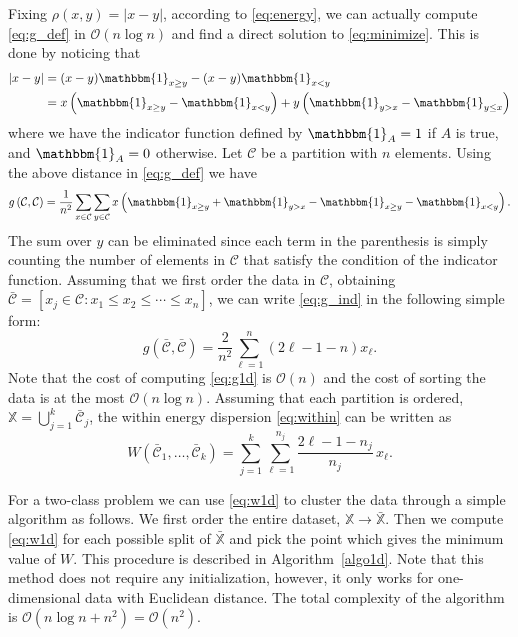 \documentclass[aps,preprint,nofootinbib,floatfix]{revtex4-1}
\newcommand\C{{\mathcal{C}}}
\newcommand\OO{{\mathcal{O}}}
\newcommand{\Ind}[1]{\mathbbm{1}_{#1}}
\begin{document}
Fixing
$\rho(x,y) = |x - y|$, according to \eqref{eq:energy}, we can actually compute 
\eqref{eq:g_def} in $\OO(n \log n)$ and find
a direct solution to \eqref{eq:minimize}. 
This is done by noticing that
\begin{equation}
\begin{aligned}
|x - y|  &= (x-y)\Ind{x \ge y} -
(x-y) \Ind{x < y}  \\
&= 
x \left( \Ind{x \ge y} - \Ind{x < y} \right)  + 
y \left( \Ind{y > x} - \Ind{y \le x} \right)  
\end{aligned}
\end{equation}
where we have the indicator function defined by 
$\Ind{A}=1$ if $A$ is true, and $\Ind{A}=0$ otherwise. 
Let $\C$ be a partition with
$n$ elements. Using the above distance in \eqref{eq:g_def} we have
\begin{equation}
\label{eq:g_ind}
g\left(\C,\C\right) = \dfrac{1}{n^2} \sum_{x \in \C} 
\sum_{y \in \C} 
x \left(
\Ind{x \ge y} + \Ind{y > x} - 
\Ind{x \ge y}-\Ind{x < y} \right) .
\end{equation}
The sum over $y$ can be eliminated since each term in
the parenthesis is simply counting the number of elements in $\C$ that satisfy
the condition of the indicator function. Assuming
that we first order the data in $\C$, obtaining
$\bar{\C} = [ x_j \in \C: x_1 \le x_2 \le \dotsm \le x_{n}]$, we
can write \eqref{eq:g_ind} in the following simple form:
\begin{equation}
\label{eq:g1d}
g\left(\bar{\C}, \bar{\C}\right) = 
\dfrac{2}{n^2} \sum_{\ell=1}^n (2\ell - 1 - n) x_\ell .
\end{equation}
Note that the cost of computing 
\eqref{eq:g1d}
is $\OO(n)$ and the cost of
sorting the data
is at the most $\OO(n\log n)$.
Assuming that each partition is ordered,  
$\mathbb{X} = \bigcup_{j=1}^k \bar{\C}_j$,
the within energy dispersion
\eqref{eq:within} can be written as
\begin{equation}
\label{eq:w1d}
W\left( \bar{\C}_1,\dotsc,\bar{\C}_k \right) = 
\sum_{j=1}^k \sum_{\ell=1}^{n_j} \dfrac{2\ell - 1 - n_j}{n_j} \, x_\ell.
\end{equation}

For a two-class problem we can use \eqref{eq:w1d} to cluster the data
through a simple algorithm 
as follows. We first order
the entire dataset, $\mathbb{X} \to \bar{\mathbb{X}}$. Then 
we compute \eqref{eq:w1d} for each possible split of $\bar{\mathbb{X}}$
and pick the point which gives the minimum value of $W$. 
This procedure is described in Algorithm~\ref{algo1d}. 
Note that
this method does not require any initialization,
however,
it only works for one-dimensional data with Euclidean distance. The total
complexity of the algorithm is $\OO(n\log n + n^2) = \OO(n^2)$.
\end{document}
